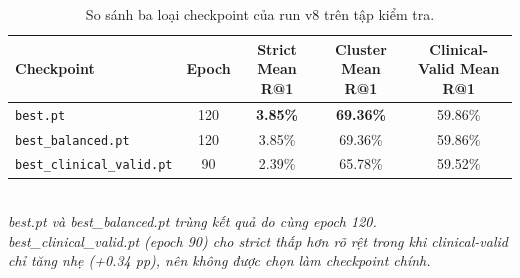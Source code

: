 \documentclass[12pt, a4paper]{article}
\begin{document}
\begin{table}[H]
  \centering
  \caption{So sánh ba loại checkpoint của run v8 trên tập kiểm tra.}
  \label{tab:ckpt_compare}
  \begin{tabular}{l ccc c}
    \toprule
    \textbf{Checkpoint} & \textbf{Epoch} &
    \textbf{Strict Mean R@1} &
    \textbf{Cluster Mean R@1} &
    \textbf{Clinical-Valid Mean R@1} \\
    \midrule
    \texttt{best.pt}               & 120 & \textbf{3.85\%} & \textbf{69.36\%} & 59.86\% \\
    \texttt{best\_balanced.pt}     & 120 & 3.85\% & 69.36\% & 59.86\% \\
    \texttt{best\_clinical\_valid.pt} & 90 & 2.39\% & 65.78\% & 59.52\% \\
    \bottomrule
  \end{tabular}
  \vspace{0.3em}\\
  \small \textit{best.pt và best\_balanced.pt trùng kết quả do cùng epoch 120.
    best\_clinical\_valid.pt (epoch 90) cho strict thấp hơn rõ rệt trong khi
    clinical-valid chỉ tăng nhẹ (+0.34 pp), nên không được chọn làm checkpoint
    chính.}
\end{table}
\end{document}
